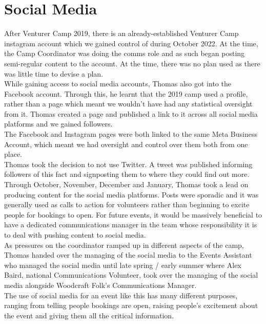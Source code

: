 \section{Social Media}
After Venturer Camp 2019, there is an already-established Venturer Camp instagram account which we gained control of during October 2022. At the time, the Camp Coordinator was doing the comms role and as such began posting semi-regular content to the account. At the time, there was no plan used as there was little time to devise a plan.\\

While gaining access to social media accounts, Thomas also got into the Facebook account. Through this, he learnt that the 2019 camp used a profile, rather than a page which meant we wouldn't have had any statistical oversight from it. Thomas created a page and published a link to it across all social media platforms and we gained followers.\\

The Facebook and Instagram pages were both linked to the same Meta Business Account, which meant we had oversight and control over them both from one place.\\

Thomas took the decision to not use Twitter. A tweet was published informing followers of this fact and signposting them to where they could find out more.\\

Through October, November, December and January, Thomas took a lead on producing content for the social media platforms. Posts were sporadic and it was generally used as calls to action for volunteers rather than beginning to excite people for bookings to open. For future events, it would be massively beneficial to have a dedicated communications manager in the team whose responsibility it is to deal with pushing content to social media.\\

As pressures on the coordinator ramped up in different aspects of the camp, Thomas handed over the managing of the social media to the Events Assistant who managed the social media until late spring / early summer where Alex Baird, national Communications Volunteer,  took over the managing of the social media alongside Woodcraft Folk's Communications Manager. \\

The use of social media for an event like this has many different purposes, ranging from telling people bookings are open, raising people's excitement about the event and giving them all the critical information.\\

